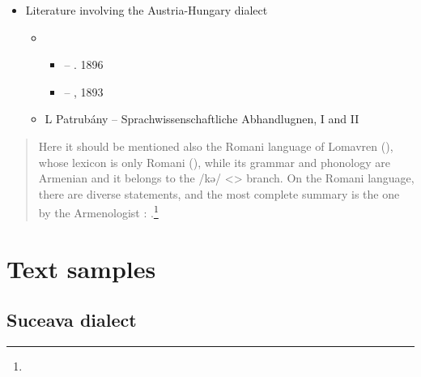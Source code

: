 \begin{itemize}
	\item Literature involving the Austria-Hungary dialect
	\begin{itemize}
		\item {} 
		\begin{itemize}
			\item – . 1896
			\item – , 1893
		\end{itemize}
		\item L Patrubány – Sprachwissenschaftliche Abhandlugnen, I and II
\end{itemize}\end{itemize}



\begin{quote}
	Here it should be mentioned also the Romani language of Lomavren (), whose lexicon is only Romani (), while its grammar and phonology are Armenian and it belongs to the /kə/ <> branch. On the Romani language, there are diverse statements, and the most complete summary is the one by the Armenologist : \citealt{Finck-1907-SpracheRomani}.\footnote{}
\end{quote}

 
\begin{adjarianpage}\label{page:273}\end{adjarianpage}%

\section{Text samples}

{\sampleoverview}

\subsection{Suceava dialect}

